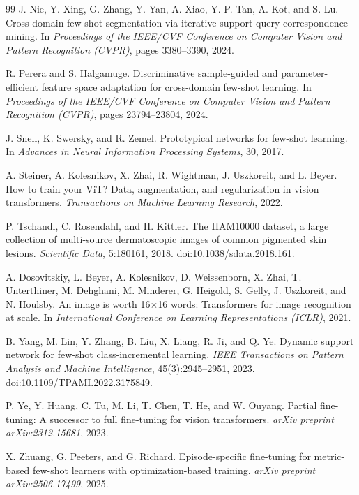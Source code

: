 \documentclass[11pt]{article}
\begin{document}
\begin{thebibliography}{99}
J. Nie, Y. Xing, G. Zhang, Y. Yan, A. Xiao, Y.-P. Tan, A. Kot, and S. Lu.
\newblock Cross-domain few-shot segmentation via iterative support-query correspondence mining.
\newblock In \emph{Proceedings of the IEEE/CVF Conference on Computer Vision and Pattern Recognition (CVPR)}, pages 3380--3390, 2024.

R. Perera and S. Halgamuge.
\newblock Discriminative sample-guided and parameter-efficient feature space adaptation for cross-domain few-shot learning.
\newblock In \emph{Proceedings of the IEEE/CVF Conference on Computer Vision and Pattern Recognition (CVPR)}, pages 23794--23804, 2024.

J. Snell, K. Swersky, and R. Zemel.
\newblock Prototypical networks for few-shot learning.
\newblock In \emph{Advances in Neural Information Processing Systems}, 30, 2017.

A. Steiner, A. Kolesnikov, X. Zhai, R. Wightman, J. Uszkoreit, and L. Beyer.
\newblock How to train your ViT? Data, augmentation, and regularization in vision transformers.
\newblock \emph{Transactions on Machine Learning Research}, 2022.

P. Tschandl, C. Rosendahl, and H. Kittler.
\newblock The HAM10000 dataset, a large collection of multi-source dermatoscopic images of common pigmented skin lesions.
\newblock \emph{Scientific Data}, 5:180161, 2018.
\newblock doi:10.1038/sdata.2018.161.

A. Dosovitskiy, L. Beyer, A. Kolesnikov, D. Weissenborn, X. Zhai, T. Unterthiner, M. Dehghani, M. Minderer, G. Heigold, S. Gelly, J. Uszkoreit, and N. Houlsby.
\newblock An image is worth 16$\times$16 words: Transformers for image recognition at scale.
\newblock In \emph{International Conference on Learning Representations (ICLR)}, 2021.

B. Yang, M. Lin, Y. Zhang, B. Liu, X. Liang, R. Ji, and Q. Ye.
\newblock Dynamic support network for few-shot class-incremental learning.
\newblock \emph{IEEE Transactions on Pattern Analysis and Machine Intelligence}, 45(3):2945--2951, 2023.
\newblock doi:10.1109/TPAMI.2022.3175849.

P. Ye, Y. Huang, C. Tu, M. Li, T. Chen, T. He, and W. Ouyang.
\newblock Partial fine-tuning: A successor to full fine-tuning for vision transformers.
\newblock \emph{arXiv preprint arXiv:2312.15681}, 2023.

X. Zhuang, G. Peeters, and G. Richard.
\newblock Episode-specific fine-tuning for metric-based few-shot learners with optimization-based training.
\newblock \emph{arXiv preprint arXiv:2506.17499}, 2025.

\end{thebibliography}
\end{document}
